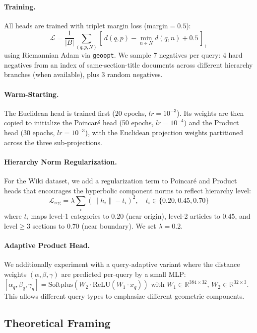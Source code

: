 \documentclass{article}
\begin{document}
\paragraph{Training.} All heads are trained with triplet margin loss (margin$=0.5$):
\[
\mathcal{L} = \frac{1}{|B|}\sum_{(q,p,N)} \left[\, d(q,p) - \min_{n \in N} d(q,n) + 0.5 \,\right]_+
\]
using Riemannian Adam \citep{becigneul2019riemannian} via \texttt{geoopt}. We sample 7 negatives per query: 4 hard negatives from an index of same-section-title documents across different hierarchy branches (when available), plus 3 random negatives.

\paragraph{Warm-Starting.} The Euclidean head is trained first (20 epochs, $lr=10^{-3}$). Its weights are then copied to initialize the Poincar\'e head (50 epochs, $lr=10^{-4}$) and the Product head (30 epochs, $lr=10^{-3}$), with the Euclidean projection weights partitioned across the three sub-projections.

\paragraph{Hierarchy Norm Regularization.} For the Wiki dataset, we add a regularization term to Poincar\'e and Product heads that encourages the hyperbolic component norms to reflect hierarchy level:
\[
\mathcal{L}_{\text{reg}} = \lambda \sum_i ({\|h_i\|} - t_i)^2, \quad t_i \in \{0.20, 0.45, 0.70\}
\]
where $t_i$ maps level-1 categories to 0.20 (near origin), level-2 articles to 0.45, and level$\geq$3 sections to 0.70 (near boundary). We set $\lambda = 0.2$.

\paragraph{Adaptive Product Head.} We additionally experiment with a query-adaptive variant where the distance weights $(\alpha, \beta, \gamma)$ are predicted per-query by a small MLP: $[\alpha_q, \beta_q, \gamma_q] = \text{Softplus}(W_2 \cdot \text{ReLU}(W_1 \cdot x_q))$ with $W_1 \in \mathbb{R}^{384 \times 32}$, $W_2 \in \mathbb{R}^{32 \times 3}$. This allows different query types to emphasize different geometric components.

\subsection{Theoretical Framing}
\end{document}
